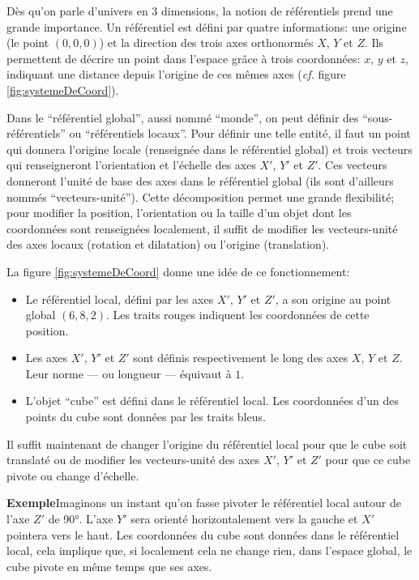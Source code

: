 Dès qu'on parle d'univers en 3 dimensions, la notion de référentiels prend une grande importance. Un référentiel est défini par quatre informations: une origine (le point $(0, 0, 0)$) et la direction des trois axes orthonormés $X$, $Y$ et $Z$. Ils permettent de décrire un point dans l'espace grâce à trois coordonnées: $x$, $y$ et $z$, indiquant une distance depuis l'origine de ces mêmes axes (\textit{cf.} figure \ref{fig:systemeDeCoord}).

Dans le \enquote{référentiel global}, aussi nommé \enquote{monde}, on peut définir des \enquote{sous-référentiels} ou \enquote{référentiels locaux}. Pour définir une telle entité, il faut un point qui donnera l'origine locale (renseignée dans le référentiel global) et trois vecteurs qui renseigneront l'orientation et l'échelle des axes $X'$, $Y'$ et $Z'$. Ces vecteurs donneront l'unité de base des axes dans le référentiel global (ils sont d'ailleurs nommés \enquote{vecteurs-unité}). Cette décomposition permet une grande flexibilité; pour modifier la position, l'orientation ou la taille d'un objet dont les coordonnées sont renseignées localement, il suffit de modifier les vecteurs-unité des axes locaux (rotation et dilatation) ou l'origine (translation).

La figure \ref{fig:systemeDeCoord} donne une idée de ce fonctionnement:
\begin{itemize}
	\item Le référentiel local, défini par les axes $X'$, $Y'$ et $Z'$, a son origine au point global $(6, 8, 2)$. Les traits rouges indiquent les coordonnées de cette position.
	\item Les axes $X'$, $Y'$ et $Z'$ sont définis respectivement le long des axes $X$, $Y$ et $Z$. Leur norme --- ou longueur --- équivaut à $1$.
	\item L'objet \enquote{cube} est défini dans le référentiel local. Les coordonnées d'un des points du cube sont données par les traits bleus.
\end{itemize}
Il suffit maintenant de changer l'origine du référentiel local pour que le cube soit translaté ou de modifier les vecteurs-unité des axes $X'$, $Y'$ et $Z'$ pour que ce cube pivote ou change d'échelle.

\textbf{Exemple}\quad Imaginons un instant qu'on fasse pivoter le référentiel local autour de l'axe $Z'$ de 90°. L'axe $Y'$ sera orienté horizontalement vers la gauche et $X'$ pointera vers le haut. Les coordonnées du cube sont données dans le référentiel local, cela implique que, si localement cela ne change rien, dans l'espace global, le cube pivote en même temps que ses axes.

